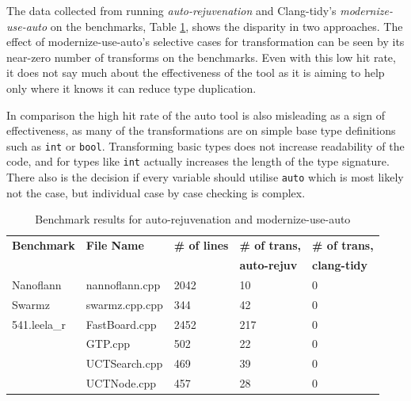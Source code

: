 \documentclass[bsc,frontabs,singlespacing,twoside,parskip,deptreport]{infthesis}
\begin{document}
 
The data collected from running \textit{auto-rejuvenation} and Clang-tidy's \textit{modernize-use-auto} on the benchmarks, Table \ref{tab:auto-tool-benchmark-res}, shows the disparity in two approaches. The effect of modernize-use-auto's selective cases for transformation can be seen by its near-zero number of transforms on the benchmarks. Even with this low hit rate, it does not say much about the effectiveness of the tool as it is aiming to help only where it knows it can reduce type duplication. 

In comparison the high hit rate of the auto tool is also misleading as a sign of effectiveness, as many of the transformations are on simple base type definitions such as \texttt{int} or \texttt{bool}. Transforming basic types does not increase readability of the code, and for types like \texttt{int} actually increases the length of the type signature. There also is the decision if every variable should utilise \texttt{auto} which is most likely not the case, but individual case by case checking is complex.


\begin{table}[H]
    \begin{center}
        \begin{tabular}{| l | l | l | l | l |}
            \hline
            \textbf{Benchmark}    & \textbf{File Name}    & \textbf{\# of lines}  & \textbf{\# of trans,} & \textbf{\# of trans,} \\ 
                                  &                       &                       & \textbf{auto-rejuv}   & \textbf{clang-tidy}   \\ \hline
            Nanoflann    & nannoflann.cpp   & 2042  & 10  & 0\\ \hline
            Swarmz       & swarmz.cpp.cpp   & 344   & 42  & 0\\ \hline
            541.leela\_r & FastBoard.cpp    & 2452    & 217 & 0\\ \hline
                         & GTP.cpp          & 502    & 22  & 0\\ \hline
                         & UCTSearch.cpp    & 469   & 39  & 0\\ \hline
                         & UCTNode.cpp        & 457   & 28  & 0\\ \hline
        \end{tabular}
        \caption{Benchmark results for auto-rejuvenation and modernize-use-auto}
        \label{tab:auto-tool-benchmark-res}
    \end{center}
\end{table}
\end{document}
